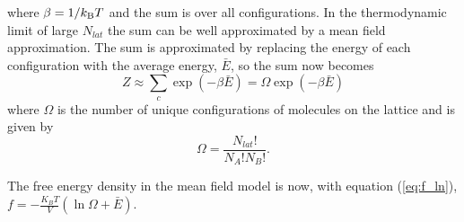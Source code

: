 where $\beta = 1/k_{\rm B} T$ and the sum is over all configurations. In the thermodynamic limit of large $N_{lat}$ the sum can be well approximated by a mean field approximation. The sum is approximated by replacing the energy of each configuration with the average energy, $\bar{E}$, so the sum now becomes
\begin{equation}
    Z \approx \sum_c \exp(-\beta \bar{E}) = \Omega \exp(-\beta \bar{E})
\end{equation}
where $\Omega$ is the number of unique configurations of molecules on the lattice and is given by
\begin{equation}
    \Omega = \frac{N_{lat}!}{N_A! N_B!}.
\end{equation}

The free energy density in the mean field model is now, with equation (\ref{eq:f_ln}), $f = -\frac{K_B T}{V} (\ln \Omega + \bar{E})$.

